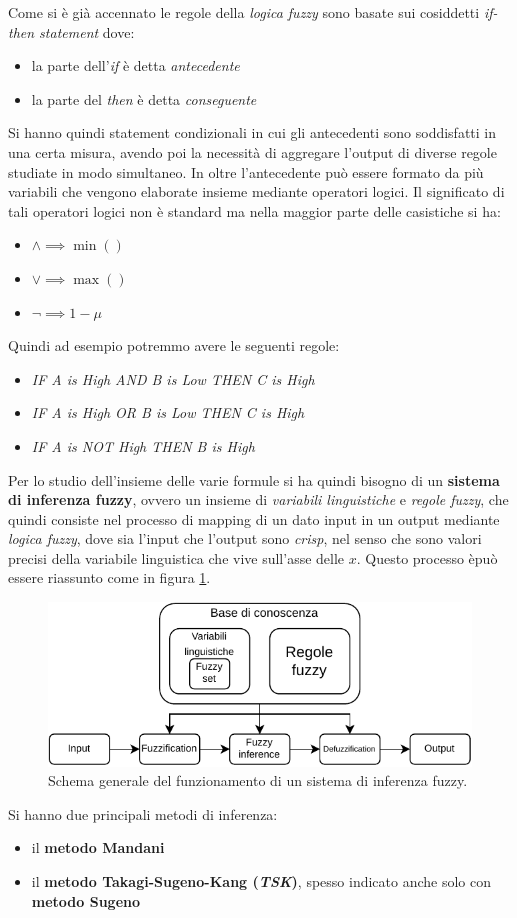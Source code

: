 \documentclass[a4paper,12pt, oneside]{book}
\begin{document}
Come si è già accennato le regole della \textit{logica fuzzy} sono basate sui
cosiddetti \textit{if-then statement} dove:
\begin{itemize}
  \item la parte dell'\textit{if} è detta \textit{antecedente}
  \item la parte del \textit{then} è detta \textit{conseguente}
\end{itemize}
Si hanno quindi statement condizionali in cui gli antecedenti sono soddisfatti
in una certa misura, avendo poi la necessità di aggregare l'output di diverse
regole studiate in modo simultaneo. In oltre l'antecedente può essere formato da
più variabili che vengono elaborate insieme mediante operatori logici. Il
significato di tali operatori logici non è standard ma nella maggior parte delle
casistiche si ha:
\begin{itemize}
  \item $\land \implies \min()$
  \item $\lor  \implies \max()$
  \item $\neg \implies 1-\mu$
\end{itemize}
Quindi ad esempio potremmo avere le seguenti regole:
\begin{itemize}
  \item \textit{IF A is High AND B is Low THEN C is High}
  \item \textit{IF A is High OR B is Low THEN C is High}
  \item \textit{IF A is NOT High THEN B is High}
\end{itemize}
Per lo studio dell'insieme delle varie formule si ha quindi bisogno di un
\textbf{sistema di inferenza fuzzy}, ovvero un insieme di \textit{variabili
  linguistiche} e \textit{regole fuzzy}, che quindi consiste nel processo di
mapping di un dato input in un output mediante \textit{logica fuzzy}, dove sia
l'input che l'output sono \textit{crisp}, nel senso che sono valori precisi
della variabile linguistica che vive sull'asse delle $x$. Questo processo èpuò
essere riassunto come in figura \ref{fig:fproc}.
\begin{figure}
  \centering
  \includegraphics[scale = 1]{img/fproc.pdf}
  \caption{Schema generale del funzionamento di un sistema di inferenza fuzzy.}
  \label{fig:fproc}
\end{figure}
Si hanno due principali metodi di inferenza:
\begin{itemize}
  \item il \textbf{metodo Mandani}
  \item il \textbf{metodo Takagi-Sugeno-Kang (\textit{TSK})}, spesso indicato
  anche solo con \textbf{metodo Sugeno}
\end{itemize}
\end{document}
